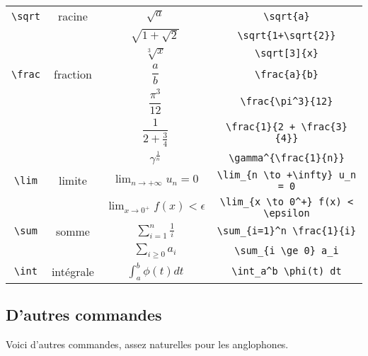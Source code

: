 \documentclass[class=report,crop=false]{standalone}
\begin{document}
\begin{tabular}{cccc@{\vrule depth 1.2ex height 4ex width 0mm \ }}

\verb?\sqrt? & racine &
   $\sqrt{a}$ & \verb?\sqrt{a}? \\
&& $\sqrt{1+\sqrt{2}}$ & \verb?\sqrt{1+\sqrt{2}}?  \\
&&  $\sqrt[3]{x}$ & \verb?\sqrt[3]{x}?  \\

\verb?\frac? & fraction &
   $\dfrac{a}{b}$ & \verb?\frac{a}{b}? \\
&& $\dfrac{\pi^3}{12}$ & \verb?\frac{\pi^3}{12}?   \\
&& $\dfrac{1}{2+ \frac{3}{4}}$ & \verb?\frac{1}{2 + \frac{3}{4}}?  \\
&& $\gamma^{\frac{1}{n}}$ & \verb?\gamma^{\frac{1}{n}}? \\


\verb?\lim? & limite &
  $\lim_{n \to + \infty} u_n = 0$ & \verb?\lim_{n \to +\infty} u_n = 0?  \\
&& $\lim_{x \to 0^+} f(x) < \epsilon$ & \verb?\lim_{x \to 0^+} f(x) < \epsilon?  \\

\verb?\sum? & somme &
   $\displaystyle \sum_{i=1}^n \frac{1}{i}$ & \verb?\sum_{i=1}^n \frac{1}{i}? \\
&& $\displaystyle \sum_{i \ge 0} a_i$ & \verb?\sum_{i \ge 0} a_i?  \\

\verb?\int? & intégrale &
  $\displaystyle \int_a^b \phi(t) dt$ & \verb?\int_a^b \phi(t) dt?  \\

\end{tabular}

\subsection{D'autres commandes}

Voici d'autres commandes, assez naturelles pour les anglophones.
\end{document}
